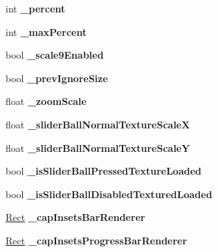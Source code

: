 \begin{DoxyCompactItemize}
\mbox{\label{classui_1_1Slider_af05ab008a166dd4dbf7ad10a5388c6bc}} 
int {\bfseries \+\_\+percent}
\item 
\mbox{\label{classui_1_1Slider_a1dc5bdad7039515589d1c513f0c770a7}} 
int {\bfseries \+\_\+max\+Percent}
\item 
\mbox{\label{classui_1_1Slider_ab5e8746d9b1ef9cd52413d1b13fcfc19}} 
bool {\bfseries \+\_\+scale9\+Enabled}
\item 
\mbox{\label{classui_1_1Slider_a4bf03ed73010862f5b1376871e60c3fb}} 
bool {\bfseries \+\_\+prev\+Ignore\+Size}
\item 
\mbox{\label{classui_1_1Slider_a543cdfd2df62079f048887e1b71a9bee}} 
float {\bfseries \+\_\+zoom\+Scale}
\item 
\mbox{\label{classui_1_1Slider_a18fcc10b0d7b5d9bb8780e8d06fda9f7}} 
float {\bfseries \+\_\+slider\+Ball\+Normal\+Texture\+ScaleX}
\item 
\mbox{\label{classui_1_1Slider_abadf62e89465805ef373d09ff91b1764}} 
float {\bfseries \+\_\+slider\+Ball\+Normal\+Texture\+ScaleY}
\item 
\mbox{\label{classui_1_1Slider_a4e60bdf02aca65c159c963ac54314630}} 
bool {\bfseries \+\_\+is\+Slider\+Ball\+Pressed\+Texture\+Loaded}
\item 
\mbox{\label{classui_1_1Slider_a7f949c789fa35bb7efc480309f2065c5}} 
bool {\bfseries \+\_\+is\+Slider\+Ball\+Disabled\+Textured\+Loaded}
\item 
\mbox{\label{classui_1_1Slider_a0031334e7d395b7f67e1c61d851d7204}} 
\hyperlink{classRect}{Rect} {\bfseries \+\_\+cap\+Insets\+Bar\+Renderer}
\item 
\mbox{\label{classui_1_1Slider_a396f547ce890045152ad6ca2ccc5d057}} 
\hyperlink{classRect}{Rect} {\bfseries \+\_\+cap\+Insets\+Progress\+Bar\+Renderer}
\item 
\mbox{\label{classui_1_1Slider_a9a8afbeb20dfcad0367d9a1d27406a3d}} 

\end{DoxyCompactItemize}
